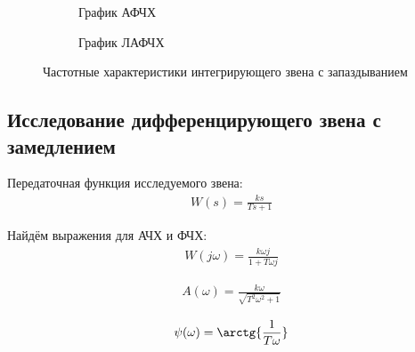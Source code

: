 \documentclass[a4paper, 11pt]{article}
\begin{document}
\begin{figure}[h!]
    \begin{subfigure}{0.5\textwidth}
        \centering
        \caption{График АФЧХ}
    \end{subfigure}
    \begin{subfigure}{0.5\textwidth}
        \centering
        \caption{График ЛАФЧХ}
    \end{subfigure}
    \caption{Частотные характеристики интегрирующего звена с запаздыванием}
\end{figure}

\newpage
\begin{center}
	\section{Исследование дифференцирующего звена с замедлением}
\end{center}

\par 
Передаточная функция исследуемого звена:
\begin{align}
	W(s)=\frac{ks}{Ts+1}
\end{align}
\par 
Найдём выражения для АЧХ и ФЧХ:
\begin{align}
W(j\omega) = \frac{k\omega j}{1+T \omega j}
\end{align}

\begin{align}
	A(\omega) = \frac{k\omega}{\sqrt{T^2\omega^2 + 1}}
\end{align}

\begin{align}
\psi(\omega) = \arctg{\frac{1}{T\omega}}
\end{align}
\end{document}
